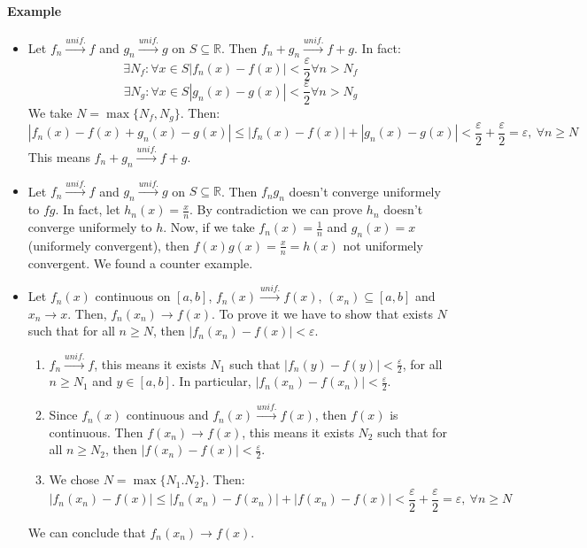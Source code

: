 \documentclass{article}
\newcommand{\abs}[1]{\left|#1\right|}
\newcommand{\tounif}{\xrightarrow{unif.}}
\newcommand{\intcc}[1]{\left[#1\right]}
\newcommand{\R}{\mathbb{R}}
\newcommand{\Ep}{\varepsilon}
\newcommand{\Example}{\paragraph{Example}}
\begin{document}
	\Example
\begin{itemize}
	\item %
	Let $f_n \tounif f$ and $g_n \tounif g$ on $S \subseteq \R$. Then $f_n + g_n
	\tounif f + g$. In fact:
\begin{equation*}
	\exists N_f : \forall x \in S \abs{f_n(x) - f(x)} < \frac{\Ep}{2} \forall n > N_f
\end{equation*}
\begin{equation*}
	\exists N_g : \forall x \in S \abs{g_n(x) - g(x)} < \frac{\Ep}{2} \forall n > N_g
\end{equation*}
	We take $N = \max \{ N_f, N_g \}$. Then:
\begin{equation*}
	\abs{f_n(x) - f(x) + g_n(x) - g(x)} \leq \abs{f_n(x) - f(x)} + \abs{g_n(x) -
	g(x)} < \frac{\Ep}{2} + \frac{\Ep}{2} = \Ep, \ \forall n \geq N
\end{equation*}
	This means $f_n + g_n \tounif f + g$.

	\item %
	Let $f_n \tounif f$ and $g_n \tounif g$ on $S \subseteq \R$. Then $f_n g_n$
	doesn't converge uniformely to $fg$. In fact, let $h_n(x) = \frac{x}{n}$.
	By contradiction we can prove $h_n$ doesn't converge uniformely to $h$. Now,
	if we take $f_n(x) = \frac{1}{n}$ and $g_n(x) = x$ (uniformely convergent),
	then $f(x) g(x) = \frac{x}{n} = h(x)$ not uniformely convergent. We found a
	counter example.

	\item %
	Let $f_n(x)$ continuous on $\intcc{a,b}$, $f_n(x) \tounif f(x)$, $(x_n)
	\subseteq \intcc{a,b}$ and $x_n \to x$. Then, $f_n(x_n) \to f(x)$. To prove it
	we have to show that exists $N$ such that for all $n \geq N$, then
	$\abs{f_n(x_n) - f(x)} < \Ep$.
	\begin{enumerate}
		\item $f_n \tounif f$, this means it exists $N_1$ such that $\abs{f_n(y) -
		f(y)} < \frac{\Ep}{2}$, for all $n \geq N_1$ and $y \in \intcc{a,b}$. In
		particular, $\abs{f_n(x_n) - f(x_n)} < \frac{\Ep}{2}$.

		\item Since $f_n(x)$ continuous and $f_n(x) \tounif f(x)$, then $f(x)$ is
		continuous. Then $f(x_n) \to f(x)$, this means it exists $N_2$ such that
		for all $n \geq N_2$, then $\abs{f(x_n) - f(x)} < \frac{\Ep}{2}$.

		\item We chose $N = \max \{ N_1. N_2 \}$. Then:
		\begin{equation*}
			\abs{f_n(x_n) - f(x)} \leq \abs{f_n(x_n) - f(x_n)} + \abs{f(x_n) - f(x)} <
			\frac{\Ep}{2} + \frac{\Ep}{2} = \Ep, \ \forall n \geq N
		\end{equation*}
	\end{enumerate}
	We can conclude that $f_n(x_n) \to f(x)$.
\end{itemize}
\end{document}
